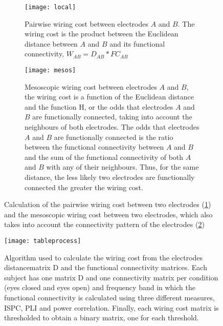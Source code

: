 \documentclass[11pt, onecolumn]{article}
\begin{document}
\begin{figure}[ht] 
  \begin{subfigure}[t]{0.5\linewidth}
    \centering
    \texttt{[image: local]} 
    \caption{Pairwise wiring cost between electrodes $A$ and $B$. The wiring cost is the product between the Euclidean distance between $A$ and $B$ and its functional connectivity, $W_{AB} = D_{AB} * FC_{AB}$} 
    \label{fig:wca} 
    \vspace{4ex}
  \end{subfigure}%
  \hspace{1ex}
  \begin{subfigure}[t]{0.5\linewidth}
    \centering
    \texttt{[image: mesos]} 
    \caption{Mesoscopic wiring cost between electrodes $A$ and $B$, the wiring cost is a function of the Euclidean distance and the function H, or the odds that electrodes $A$ and $B$ are functionally connected, taking into account the neighbours of both electrodes. The odds that electrodes $A$ and $B$ are functionally connected is the ratio between the functional connectivity between $A$ and $B$ and the sum of the functional connectivity of both $A$ and $B$ with any of their neighbours. Thus, for the same distance, the less likely two electrodes are functionally connected the greater the wiring cost.} 
    \label{fig:wcb} 
    \vspace{4ex}
  \end{subfigure} 
  \caption{Calculation of the pairwise wiring cost between two electrodes (\ref{fig:wca}) and the mesoscopic wiring cost between two electrodes, which also takes into account the connectivity pattern of the electrodes (\ref{fig:wcb})}
  \label{fig:wc} 
\end{figure}



\begin{figure}
\centering
\texttt{[image: tableprocess]} 
 \caption{Algorithm used to calculate the wiring cost from the electrodes distancematrix D and the functional connectivity matrices. Each subject has one matrix D and one connectivity matrix per condition (eyes closed and eyes open) and frequency band in which the functional connectivity is calculated using three different measures, ISPC, PLI and power correlation. Finally, each wiring cost matrix is thresholded to obtain a binary matrix, one for each threshold.}
  \label{fig:algo}
\end{figure}
\end{document}
